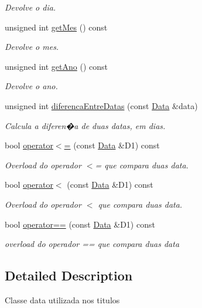 \begin{DoxyCompactItemize}
\begin{DoxyCompactList}\small\item\em Devolve o dia. \end{DoxyCompactList}\item 
unsigned int \hyperlink{classData_ab991d6a069c799930899b39bef9a4662}{get\+Mes} () const
\begin{DoxyCompactList}\small\item\em Devolve o mes. \end{DoxyCompactList}\item 
unsigned int \hyperlink{classData_ae19e0d5af87f94f2809ba52dae69e15b}{get\+Ano} () const
\begin{DoxyCompactList}\small\item\em Devolve o ano. \end{DoxyCompactList}\item 
unsigned int \hyperlink{classData_a495d15dd0d90b595740f6e09fd0a2177}{diferenca\+Entre\+Datas} (const \hyperlink{classData}{Data} \&data)
\begin{DoxyCompactList}\small\item\em Calcula a diferen�a de duas datas, em dias. \end{DoxyCompactList}\item 
bool \hyperlink{classData_a8c3fdab05b3e81bb7b302b1d4d9a9d1f}{operator$<$=} (const \hyperlink{classData}{Data} \&D1) const
\begin{DoxyCompactList}\small\item\em Overload do operador $<$= que compara duas data. \end{DoxyCompactList}\item 
bool \hyperlink{classData_a28b51c511a389cf30b9d1d2da858f3f6}{operator$<$} (const \hyperlink{classData}{Data} \&D1) const
\begin{DoxyCompactList}\small\item\em Overload do operador $<$ que compara duas data. \end{DoxyCompactList}\item 
bool \hyperlink{classData_af00bf4efbd3504689f6bc7283378ba5f}{operator==} (const \hyperlink{classData}{Data} \&D1) const
\begin{DoxyCompactList}\small\item\em overload do operador == que compara duas data \end{DoxyCompactList}\end{DoxyCompactItemize}


\subsection{Detailed Description}
Classe data utilizada nos titulos 

